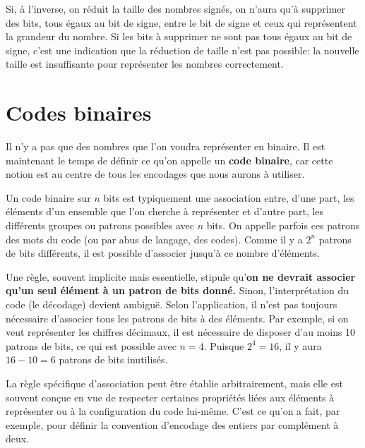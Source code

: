 \documentclass[letter, oneside]{book}
\begin{document}
\begin{enumerate}
Si, à l'inverse, on réduit la taille des nombres signés, on n'aura
qu'à supprimer des bits, tous égaux au bit de signe, entre le bit de
signe et ceux qui représentent la grandeur du nombre. Si les bits à
supprimer ne sont pas tous égaux au bit de signe, c'est une indication
que la réduction de taille n'est pas possible: la nouvelle taille est
insuffisante pour représenter les nombres correctement.
\end{enumerate}


\section{Codes binaires}
\label{sec:org7f022e4}

Il n'y a pas que des nombres que l'on voudra représenter en
binaire. Il est maintenant le temps de définir ce qu'on appelle un
\textbf{code binaire}, car cette notion est au centre de tous les encodages
que nous aurons à utiliser.

Un code binaire sur \(n\) bits est typiquement une association entre,
d'une part, les éléments d'un ensemble que l'on cherche à représenter
et d'autre part, les différents groupes ou patrons possibles avec
\(n\) bits. On appelle parfois ces patrons des mots du code (ou par abus
de langage, des codes). Comme il y a \(2^n\) patrons de bits
différents, il est possible d'associer jusqu'à ce nombre
d'éléments.

Une règle, souvent implicite mais essentielle, stipule qu'\textbf{on
ne devrait associer qu'un seul élément à un patron de bits donné.}
Sinon, l'interprétation du code (le décodage) devient ambiguë. Selon
l'application, il n'est pas toujours nécessaire d'associer tous les
patrons de bits à des éléments. Par exemple, si on veut représenter
les chiffres décimaux, il est nécessaire de disposer d'au moins 10
patrons de bits, ce qui est possible avec \(n=4\). Puisque \(2^4 =
16\), il y aura \(16 - 10 = 6\) patrons de bits inutilisés.

La règle spécifique d'association peut être établie arbitrairement,
mais elle est souvent conçue en vue de respecter certaines propriétés
liées aux éléments à représenter ou à la configuration du code
lui-même. C'est ce qu'on a fait, par exemple, pour définir la
convention d'encodage des entiers par complément à deux.
\end{document}
